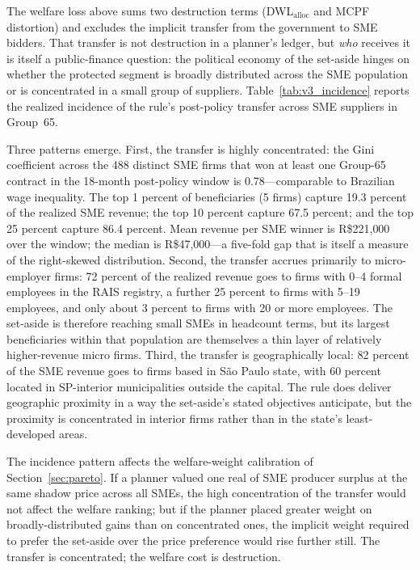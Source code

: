 The welfare loss above sums two destruction terms (DWL$_{\text{alloc}}$ and MCPF distortion) and excludes the implicit transfer from the government to SME bidders. That transfer is not destruction in a planner's ledger, but \emph{who} receives it is itself a public-finance question: the political economy of the set-aside hinges on whether the protected segment is broadly distributed across the SME population or is concentrated in a small group of suppliers. Table~\ref{tab:v3_incidence} reports the realized incidence of the rule's post-policy transfer across SME suppliers in Group~65.

Three patterns emerge. First, the transfer is highly concentrated: the Gini coefficient across the 488 distinct SME firms that won at least one Group-65 contract in the 18-month post-policy window is 0.78---comparable to Brazilian wage inequality. The top 1 percent of beneficiaries (5 firms) capture 19.3 percent of the realized SME revenue; the top 10 percent capture 67.5 percent; and the top 25 percent capture 86.4 percent. Mean revenue per SME winner is R\$221{,}000 over the window; the median is R\$47{,}000---a five-fold gap that is itself a measure of the right-skewed distribution. Second, the transfer accrues primarily to micro-employer firms: 72 percent of the realized revenue goes to firms with 0--4 formal employees in the RAIS registry, a further 25 percent to firms with 5--19 employees, and only about 3 percent to firms with 20 or more employees. The set-aside is therefore reaching small SMEs in headcount terms, but its largest beneficiaries within that population are themselves a thin layer of relatively higher-revenue micro firms. Third, the transfer is geographically local: 82 percent of the SME revenue goes to firms based in S\~ao Paulo state, with 60 percent located in SP-interior municipalities outside the capital. The rule does deliver geographic proximity in a way the set-aside's stated objectives anticipate, but the proximity is concentrated in interior firms rather than in the state's least-developed areas.

The incidence pattern affects the welfare-weight calibration of Section~\ref{sec:pareto}. If a planner valued one real of SME producer surplus at the same shadow price across all SMEs, the high concentration of the transfer would not affect the welfare ranking; but if the planner placed greater weight on broadly-distributed gains than on concentrated ones, the implicit weight required to prefer the set-aside over the price preference would rise further still. The transfer is concentrated; the welfare cost is destruction.

